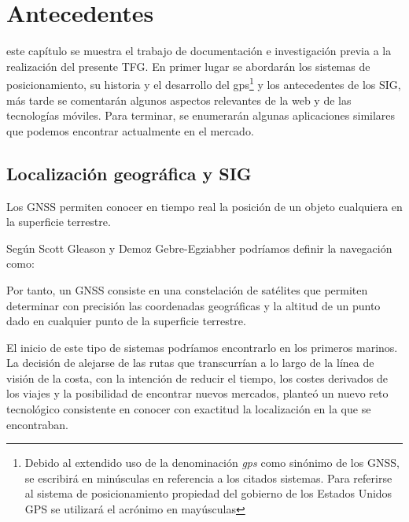 \chapter{Antecedentes}
\label{chap:antecedentes}

 este capítulo se muestra el trabajo de documentación e investigación previa a la realización del presente \ac{TFG}. En primer lugar se abordarán los sistemas de posicionamiento, su historia y el desarrollo del gps\footnote{Debido al extendido uso de la denominación \textit{gps} como sinónimo de los \ac{GNSS}, se escribirá en minúsculas en referencia a los citados sistemas. Para referirse al sistema de posicionamiento propiedad del gobierno de los Estados Unidos \acf{GPS} se utilizará el acrónimo en mayúsculas}  y los antecedentes de los \ac{SIG}, más tarde se comentarán algunos aspectos relevantes de la web y de las tecnologías móviles. Para terminar, se enumerarán algunas aplicaciones similares que podemos encontrar actualmente en el mercado.

\section{Localización geográfica y \acf{SIG}}

Los \ac{GNSS} permiten conocer en tiempo real la posición de un objeto cualquiera en la superficie terrestre.

Según Scott Gleason y Demoz Gebre-Egziabher \cite{Glea09} podríamos definir la navegación como:

	\vspace{5mm}
	\vspace{5mm}

Por tanto, un \ac{GNSS} consiste en una constelación de satélites que permiten determinar con precisión las coordenadas geográficas y la altitud de un punto dado en cualquier punto de la superficie terrestre.

El inicio de este tipo de sistemas podríamos encontrarlo en los primeros marinos. La decisión de alejarse de las rutas que transcurrían a lo largo de la línea de visión de la costa, con la intención de reducir el tiempo, los costes derivados de los viajes y la posibilidad de encontrar nuevos mercados, planteó un nuevo reto tecnológico consistente en conocer con exactitud la localización en la que se encontraban.


